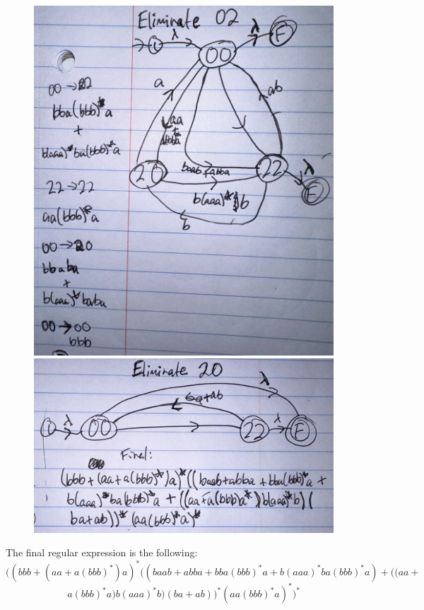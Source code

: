 \documentclass[12pt]{article}
\begin{document}
\begin{figure} [!h]
	\centering
	\includegraphics[scale=.2]{14.10.3.7}
	\includegraphics[scale=.2]{14.10.3.8}
\end{figure}

The final regular expression is the following:
\[ ((bbb + (aa + a(bbb)^*)a)^* ((baab+abba+bba(bbb)^*a + b(aaa)^*ba(bbb)^*a) + ((aa + \]
\[a(bbb)^*a)b(aaa)^*b) (ba + ab))^* (aa(bbb)^*a)^*)^* \]
\end{document}
